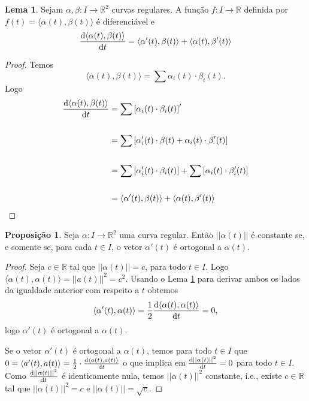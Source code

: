 \documentclass[12pt,leqno,twoside]{amsart}
\theoremstyle{definition}
\newtheorem{lema}{Lema}[section]
\newtheorem{proposicao}{Proposição}[section]
\begin{document}
\begin{lema}\label{l1} Sejam $\alpha, \beta:I\to \mathbb{R}^2$  curvas regulares.  A função $f:I\to \mathbb{R}$ definida por $f(t)= \langle \alpha(t), \beta(t)\rangle$ é diferenciável e
	$$\odv{ \langle \alpha(t), \beta(t)\rangle}{t} =  \langle \alpha'(t) , \beta(t) \rangle +  \langle \alpha(t) , \beta'(t) \rangle $$
\end{lema}
\begin{proof}
	Temos $$\langle \alpha(t), \beta(t)\rangle = \sum \alpha_i(t) \cdot \beta_i(t).$$
	Logo
	\begin{align*}
		\odv{\langle \alpha(t), \beta(t)\rangle}{t} &= \sum \left[\alpha_i(t) \cdot \beta_i(t)\right]'\\~\\
		&= \sum \left[ \alpha_i'(t)\cdot \beta(t)+\alpha_i(t)\cdot \beta'(t)\right] \\~\\
		&= \sum \left[ \alpha_i'(t)\cdot \beta_i(t)\right] + \sum \left[\alpha_i(t)\cdot \beta_i'(t)\right] \\~\\
		&= \langle \alpha'(t) , \beta(t) \rangle + \langle \alpha(t) , \beta'(t) \rangle
	\end{align*}


\end{proof}
\begin{proposicao}
	Seja $\alpha:I\to \mathbb{R}^2$ uma curva regular. Então $\left|\left|\alpha(t)\right|\right|$ é constante se, e somente se, para cada $t\in I$, o vetor $\alpha'(t)$ é ortogonal a $\alpha(t)$.
\end{proposicao}
\begin{proof}
	 Seja  $c\in \mathbb{R}$ tal que $ ||\alpha(t)|| = c $, para todo $t\in I $.  Logo $ \langle \alpha(t), \alpha(t) \rangle = ||a(t)||^2 = c^2$. Usando o Lema \ref{l1} para derivar ambos os lados da igualdade anterior com respeito a $t$ obtemos $$ \langle \alpha'(t), \alpha(t) \rangle = \frac{1}{2}\odv{ \langle \alpha(t),  \alpha(t) \rangle}{t}  = 0,$$ logo $\alpha'(t)$ é ortogonal a $\alpha(t)$.

	Se o vetor $\alpha'(t)$ é ortogonal a $\alpha(t)$, temos para todo $t\in I$ que $ 0 = \langle a'(t), a(t) \rangle = \frac{ 1}{2}\cdot \odv{ \langle a(t),  a(t) \rangle}{t} $ o que implica em $ \odv{|| \alpha(t)||^2}{t} = 0$ para todo $t\in I$. Como $\odv{||\alpha(t)||^2}{t}$ é identicamente nula, temos $||\alpha(t) ||^2$ constante, i.e., existe $c \in \mathbb{R}$  tal que $||\alpha(t) ||^2 = c$  e $ ||\alpha(t)|| = \sqrt{c}$.
\end{proof}
\end{document}
